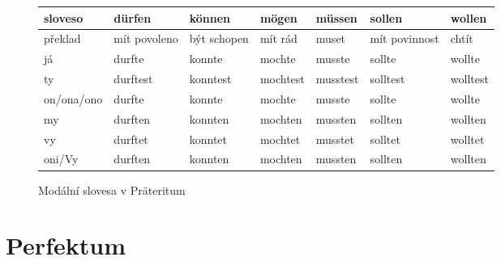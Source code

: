 \documentclass[a4paper,12pt]{report}
\begin{document}
\begin{figure}[h]
  \centering
  \begin{center}
    \begin{longtable}{ | m{2cm} | m{1.8cm}| m{1.8cm} | m{1.8cm}  | m{1.8cm} | m{1.8cm} | m{1.8cm} | }
      \hline
      sloveso    & dürfen                & können               & mögen            & müssen   & sollen                 & wollen   \\
      \hline
      překlad    & mít \newline povoleno & být \newline schopen & mít \newline rád & muset    & mít \newline povinnost & chtít    \\
      \hline
      já         & durfte                & konnte               & mochte           & musste   & sollte                 & wollte   \\
      ty         & durftest              & konntest             & mochtest         & musstest & solltest               & wolltest \\
      on/ona/ono & durfte                & konnte               & mochte           & musste   & sollte                 & wollte   \\
      my         & durften               & konnten              & mochten          & mussten  & sollten                & wollten  \\
      vy         & durftet               & konntet              & mochtet          & musstet  & solltet                & wolltet  \\
      oni/Vy     & durften               & konnten              & mochten          & mussten  & sollten                & wollten  \\
      \hline
    \end{longtable}
  \end{center}
  \caption*{Modální slovesa v Präteritum}
\end{figure}

\section{Perfektum}
\end{document}
